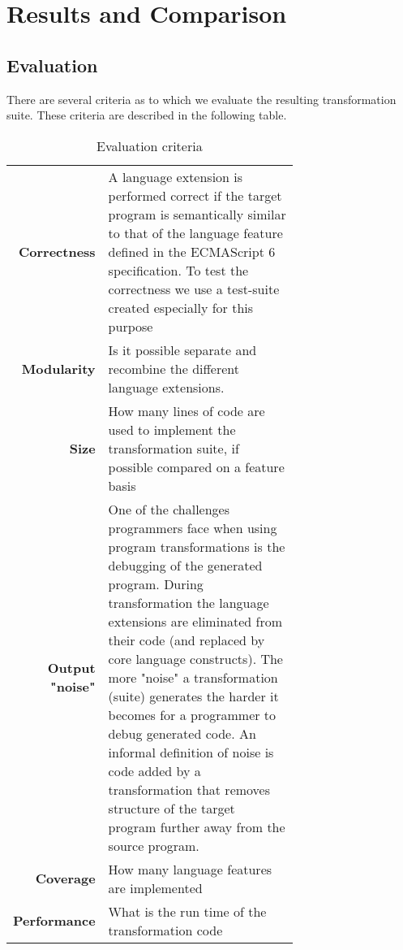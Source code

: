 
\chapter{Results and Comparison} %

\label{Chapter4}


\section{Evaluation}

There are several criteria as to which we evaluate the resulting transformation suite. These criteria are described in the following table.

\begin{table}[h]
\def\arraystretch{1.5}
\caption{Evaluation criteria}
\label{criteria}
\begin{tabular}{rp{0.7\linewidth}}
{\bf Correctness} & A language extension is performed correct if the target program is semantically similar to that of the language feature defined in the ECMAScript 6 specification\cite{SpecJS}. To test the correctness we use a test-suite created especially for this purpose\footnotemark\\
{\bf Modularity}  & Is it possible separate and recombine the different language extensions.\\
{\bf Size}        & How many lines of code are used to implement the transformation suite, if possible compared on a feature basis\\
{\bf Output "noise"} & One of the challenges programmers face when using program transformations is the debugging of the generated program. During transformation the language extensions are eliminated from their code (and replaced by core language constructs). The more "noise" a transformation (suite) generates the harder it becomes for a programmer to debug generated code. An informal definition of noise is code added by a transformation that removes structure of the target program further away from the source program. \\
{\bf Coverage}    & How many language features are implemented\\
{\bf Performance} & What is the run time of the transformation code\\
\end{tabular}
\end{table}

